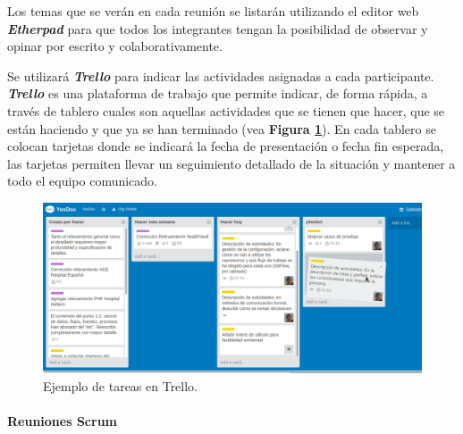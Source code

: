 Los temas que se verán en cada reunión se listarán utilizando el editor web \textbf{\textit{Etherpad}} para que todos los integrantes tengan la posibilidad de observar y opinar por escrito y colaborativamente.


Se utilizará \textbf{\textit{Trello}} para indicar las actividades asignadas a cada participante. \textbf{\textit{Trello}} es una plataforma de trabajo que permite indicar, de forma rápida, a través de tablero cuales son aquellas actividades que se tienen que hacer, que se están haciendo y que ya se han terminado (vea \textbf{Figura \ref{trello_tareas}}). En cada tablero  se colocan tarjetas donde se indicará la fecha de presentación o fecha fin esperada, las tarjetas permiten llevar un seguimiento detallado de la situación y mantener a todo el equipo comunicado.


    \begin{figure}
      \centering
      \includegraphics[width=.8\textwidth]{img/tp2_definicion/trello_tareas}
      \caption{Ejemplo de tareas en Trello.}
      \label{trello_tareas}
    \end{figure}

\paragraph{Reuniones Scrum}

